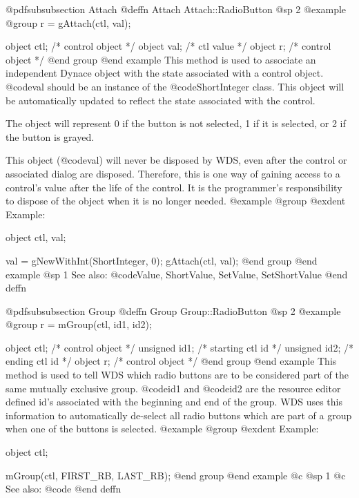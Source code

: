 @pdfsubsubsection {Attach}
@deffn {Attach} Attach::RadioButton
@sp 2
@example
@group
r = gAttach(ctl, val);

object  ctl;   /*  control object  */
object  val;   /*  ctl value       */
object  r;     /*  control object  */
@end group
@end example
This method is used to associate an independent Dynace object with the
state associated with a control object.  @code{val} should be an
instance of the @code{ShortInteger} class.  This object will be
automatically updated to reflect the state associated with the control.

The object will represent 0 if the button is not selected, 1 if it is
selected, or 2 if the button is grayed.

This object (@code{val}) will never be disposed by WDS, even after
the control or associated dialog are disposed.  Therefore, this
is one way of gaining access to a control's value after the life
of the control.  It is the programmer's responsibility to dispose of
the object when it is no longer needed.
@example
@group
@exdent Example:

object  ctl, val;

val = gNewWithInt(ShortInteger, 0);
gAttach(ctl, val);
@end group
@end example
@sp 1
See also:  @code{Value, ShortValue, SetValue, SetShortValue}
@end deffn











@pdfsubsubsection {Group}
@deffn {Group} Group::RadioButton
@sp 2
@example
@group
r = mGroup(ctl, id1, id2);

object  ctl;    /*  control object   */
unsigned id1;   /*  starting ctl id  */
unsigned id2;   /*  ending ctl id    */
object  r;      /*  control object   */
@end group
@end example
This method is used to tell WDS which radio buttons are to be considered
part of the same mutually exclusive group.  @code{id1} and @code{id2}
are the resource editor defined id's associated with the beginning and
end of the group.  WDS uses this information to automatically de-select
all radio buttons which are part of a group when one of the buttons is
selected.
@example
@group
@exdent Example:

object  ctl;

mGroup(ctl, FIRST_RB, LAST_RB);
@end group
@end example
@c @sp 1
@c See also:  @code{}
@end deffn











